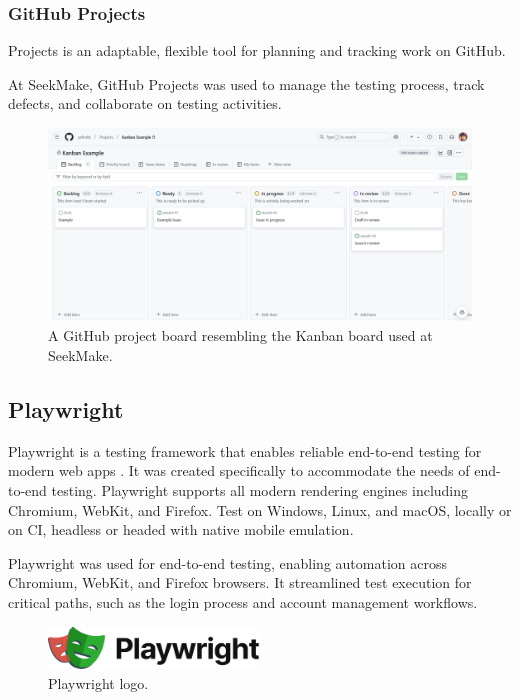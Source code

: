 \subsubsection{GitHub Projects}
Projects is an adaptable, flexible tool for planning and tracking work on GitHub. \cite{ghprojects}

At SeekMake, GitHub Projects was used to manage the testing process, track defects, and collaborate on testing activities.

\begin{figure}[H]
    \centering
    \includegraphics[width=\textwidth]{project/images/kanban.png}
    \caption{A GitHub project board resembling the Kanban board used at SeekMake.}
    \label{fig:github-kanban}
\end{figure}

\subsection{Playwright}
Playwright is a testing framework that enables reliable end-to-end testing for modern web apps \cite{pwhp}. It was created specifically to accommodate the needs of end-to-end testing. Playwright supports all modern rendering engines including Chromium, WebKit, and Firefox. Test on Windows, Linux, and macOS, locally or on CI, headless or headed with native mobile emulation. \cite{pwdocs}

Playwright was used for end-to-end testing, enabling automation across Chromium, WebKit, and Firefox browsers. It streamlined test execution for critical paths, such as the login process and account management workflows.

\begin{figure}[H]
    \centering
    \includegraphics[width=0.5\textwidth]{project/images/Playwright_Logo.svg.png}
    \caption{Playwright logo.}
    \label{fig:playwright-logo}
\end{figure}

